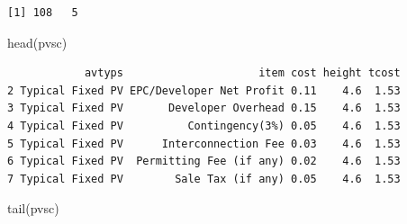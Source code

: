 \documentclass[
  letterpaper,
  DIV=11,
  numbers=noendperiod]{scrartcl}
\newenvironment{Shaded}{\begin{snugshade}}{\end{snugshade}}
\newcommand{\AttributeTok}[1]{\textcolor[rgb]{0.40,0.45,0.13}{#1}}
\newcommand{\ConstantTok}[1]{\textcolor[rgb]{0.56,0.35,0.01}{#1}}
\newcommand{\DecValTok}[1]{\textcolor[rgb]{0.68,0.00,0.00}{#1}}
\newcommand{\FunctionTok}[1]{\textcolor[rgb]{0.28,0.35,0.67}{#1}}
\newcommand{\NormalTok}[1]{\textcolor[rgb]{0.00,0.23,0.31}{#1}}
\newcommand{\OtherTok}[1]{\textcolor[rgb]{0.00,0.23,0.31}{#1}}
\newcommand{\SpecialCharTok}[1]{\textcolor[rgb]{0.37,0.37,0.37}{#1}}
\newcommand{\StringTok}[1]{\textcolor[rgb]{0.13,0.47,0.30}{#1}}
\begin{document}
\begin{Shaded}
\end{Shaded}

\begin{verbatim}
[1] 108   5
\end{verbatim}

\begin{Shaded}
\begin{Highlighting}[]
\FunctionTok{head}\NormalTok{(pvsc)}
\end{Highlighting}
\end{Shaded}

\begin{verbatim}
            avtyps                     item cost height tcost
2 Typical Fixed PV EPC/Developer Net Profit 0.11    4.6  1.53
3 Typical Fixed PV       Developer Overhead 0.15    4.6  1.53
4 Typical Fixed PV          Contingency(3%) 0.05    4.6  1.53
5 Typical Fixed PV      Interconnection Fee 0.03    4.6  1.53
6 Typical Fixed PV  Permitting Fee (if any) 0.02    4.6  1.53
7 Typical Fixed PV        Sale Tax (if any) 0.05    4.6  1.53
\end{verbatim}

\begin{Shaded}
\begin{Highlighting}[]
\FunctionTok{tail}\NormalTok{(pvsc)}
\end{Highlighting}
\end{Shaded}
\end{document}
